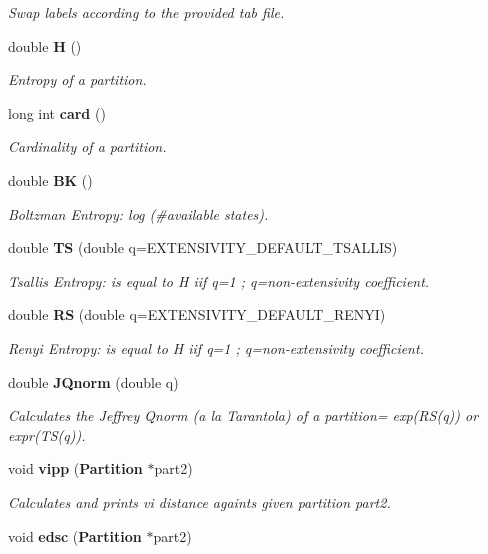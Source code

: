 \begin{CompactItemize}
\begin{CompactList}\small\item\em Swap labels according to the provided tab file. \item\end{CompactList}\item 
double {\bf H} ()\label{classPartition_a26}

\begin{CompactList}\small\item\em Entropy of a partition. \item\end{CompactList}\item 
long int {\bf card} ()\label{classPartition_a27}

\begin{CompactList}\small\item\em Cardinality of a partition. \item\end{CompactList}\item 
double {\bf BK} ()\label{classPartition_a28}

\begin{CompactList}\small\item\em Boltzman Entropy: log (\#available states). \item\end{CompactList}\item 
double {\bf TS} (double q=EXTENSIVITY\_\-DEFAULT\_\-TSALLIS)\label{classPartition_a29}

\begin{CompactList}\small\item\em Tsallis Entropy: is equal to H iif q=1 ; q=non-extensivity coefficient. \item\end{CompactList}\item 
double {\bf RS} (double q=EXTENSIVITY\_\-DEFAULT\_\-RENYI)\label{classPartition_a30}

\begin{CompactList}\small\item\em Renyi Entropy: is equal to H iif q=1 ; q=non-extensivity coefficient. \item\end{CompactList}\item 
double {\bf JQnorm} (double q)\label{classPartition_a31}

\begin{CompactList}\small\item\em Calculates the Jeffrey Qnorm (a la Tarantola) of a partition= exp(RS(q)) or expr(TS(q)). \item\end{CompactList}\item 
void {\bf vipp} ({\bf Partition} $\ast$part2)
\begin{CompactList}\small\item\em Calculates and prints vi distance againts given partition part2. \item\end{CompactList}\item 
void {\bf edsc} ({\bf Partition} $\ast$part2)\label{classPartition_a33}


\end{CompactItemize}
